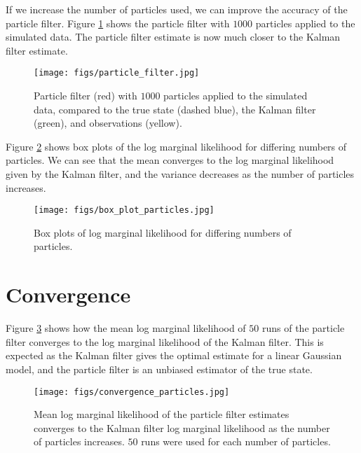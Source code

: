 \documentclass[12pt]{article}
\begin{document}
If we increase the number of particles used, we can improve the accuracy of the particle filter. 
Figure \ref{fig:particle_filter_1000} shows the particle filter with $1000$ particles applied to the simulated data.
The particle filter estimate is now much closer to the Kalman filter estimate.

\begin{figure}[H]
    \centering
    \texttt{[image: figs/particle\_filter.jpg]}
    \caption{Particle filter (red) with $1000$ particles applied to the simulated data, compared to the true state (dashed blue), the Kalman filter (green), and observations (yellow).}
    \label{fig:particle_filter_1000}
\end{figure}

Figure \ref{fig:box_plot_particles} shows box plots of the log marginal likelihood for differing numbers of particles. 
We can see that the mean converges to the log marginal likelihood given by the Kalman filter, and the variance decreases as the number of particles increases.

\begin{figure}[H]
    \centering
    \texttt{[image: figs/box\_plot\_particles.jpg]}
    \caption{Box plots of log marginal likelihood for differing numbers of particles.}
    \label{fig:box_plot_particles}
\end{figure}



\section{Convergence}

Figure \ref{fig:convergence_particles} shows how the mean log marginal likelihood of $50$ runs of the particle filter converges to the log marginal likelihood of the Kalman filter. This is expected as the Kalman filter gives the optimal estimate for a linear Gaussian model, and the particle filter is an unbiased estimator of the true state.

\begin{figure}[H]
    \centering
    \texttt{[image: figs/convergence\_particles.jpg]}
    \caption{Mean log marginal likelihood of the particle filter estimates converges to the Kalman filter log marginal likelihood as the number of particles increases. $50$ runs were used for each number of particles.}
    \label{fig:convergence_particles}
\end{figure}
\end{document}
